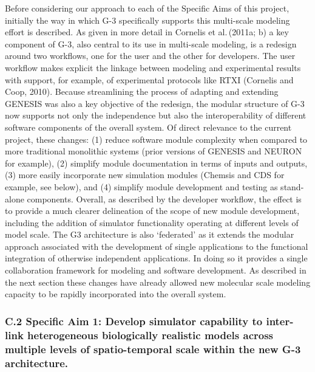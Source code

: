 \documentclass[12pt]{article}
\begin{document}
\noindent Before considering our approach to each of the Specific Aims
of this project, initially the way in which
G-3 specifically supports this multi-scale modeling effort is described. As
given in more detail in Cornelis et al.\,(2011a; b) a key
component of G-3, also central to its use in multi-scale
modeling, is a redesign around two workflows, one for the user and the
other for developers. The user workflow makes explicit the
linkage between modeling and experimental results with support, for
example, of experimental protocols like RTXI (Cornelis and Coop,
2010).  Because streamlining the
process of adapting and extending GENESIS was also a key objective of
the redesign, the modular structure of G-3 now supports not only the
independence but also the interoperability of different software
components of the overall system. Of direct relevance to the current
project, these changes: (1) reduce software module complexity 
when compared to more traditional monolithic systems (prior versions
of GENESIS and NEURON for example), (2) simplify module documentation
 in terms of inputs and outputs, (3) more easily incorporate
new simulation modules (Chemsis and CDS for example, see below),
and (4) simplify module development and testing as stand-alone
components. Overall, as described by the developer workflow, the effect is to provide a much clearer
delineation of the scope of new module development, including the addition of simulator functionality operating
at different levels of model scale.  The G3 architecture is also
`federated' as it extends the modular approach associated with the
development of single applications to the functional integration of
otherwise independent applications. In doing so it provides a single
collaboration framework for modeling and software development. As
described in the next section these changes have already allowed
new molecular scale modeling capacity to be rapidly incorporated into the
overall system.\\ %

\subsubsection*{C.2 Specific Aim 1: Develop simulator capability to inter-link heterogeneous biologically realistic models across multiple levels of spatio-temporal scale within the new G-3 architecture.}
\end{document}
